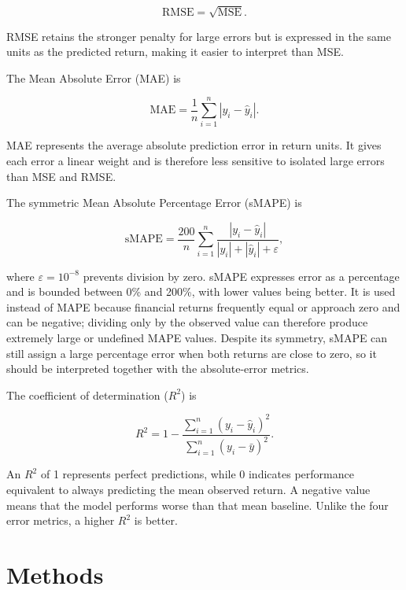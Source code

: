 \documentclass[12pt,a4paper]{article}
\begin{document}
\begin{equation}
    \mathrm{RMSE} = \sqrt{\mathrm{MSE}}.
\end{equation}

RMSE retains the stronger penalty for large errors but is expressed in the
same units as the predicted return, making it easier to interpret than MSE.

The Mean Absolute Error (MAE) is

\begin{equation}
    \mathrm{MAE} = \frac{1}{n}\sum_{i=1}^{n}|y_i-\hat{y}_i|.
\end{equation}

MAE represents the average absolute prediction error in return units. It gives
each error a linear weight and is therefore less sensitive to isolated large
errors than MSE and RMSE.

The symmetric Mean Absolute Percentage Error (sMAPE) is

\begin{equation}
    \mathrm{sMAPE}
    = \frac{200}{n}\sum_{i=1}^{n}
      \frac{|y_i-\hat{y}_i|}{|y_i|+|\hat{y}_i|+\varepsilon},
\end{equation}

where $\varepsilon=10^{-8}$ prevents division by zero. sMAPE expresses error
as a percentage and is bounded between 0\% and 200\%, with lower values being
better. It is used instead of MAPE because financial returns frequently equal
or approach zero and can be negative; dividing only by the observed value can
therefore produce extremely large or undefined MAPE values. Despite its
symmetry, sMAPE can still assign a large percentage error when both returns are
close to zero, so it should be interpreted together with the absolute-error
metrics.

The coefficient of determination ($R^2$) is

\begin{equation}
    R^2 = 1-
    \frac{\sum_{i=1}^{n}(y_i-\hat{y}_i)^2}
         {\sum_{i=1}^{n}(y_i-\bar{y})^2}.
\end{equation}

An $R^2$ of 1 represents perfect predictions, while 0 indicates performance
equivalent to always predicting the mean observed return. A negative value
means that the model performs worse than that mean baseline. Unlike the four
error metrics, a higher $R^2$ is better.

\section{Methods}
\end{document}
